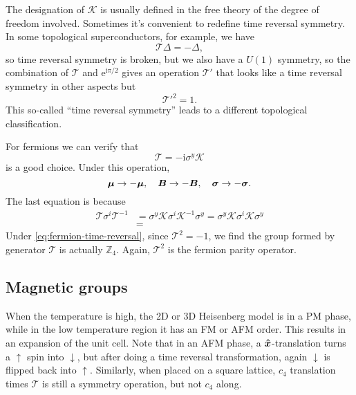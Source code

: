 \documentclass[hyperref, a4paper]{article}
\newcommand*{\ii}{\mathrm{i}}
\newcommand*{\ee}{\mathrm{e}}
\begin{document}
The designation of $\mathcal{K}$ is usually defined in the free theory of the degree of freedom involved.
Sometimes it's convenient to redefine time reversal symmetry. In some topological superconductors, for example, 
we have 
\begin{equation}
    \mathcal{T} \Delta = - \Delta, 
\end{equation}
so time reversal symmetry is broken, but we also have a $U(1)$ symmetry, so the combination of $\mathcal{T}$
and $\ee^{\ii \pi / 2}$ gives an operation $\mathcal{T}'$ that looks like a time reversal symmetry in 
other aspects but 
\begin{equation}
    \mathcal{T}'^2 = 1.
\end{equation}
This so-called ``time reversal symmetry'' leads to a different topological classification.

For fermions we can verify that 
\begin{equation}
    \mathcal{T} = - \ii \sigma^y \mathcal{K}
    \label{eq:fermion-time-reversal}
\end{equation}
is a good choice. Under this operation, 
\[
    \vb*{\mu} \to - \vb*{\mu}, \quad \vb*{B} \to - \vb*{B}, \quad \vb*{\sigma} \to - \vb*{\sigma}.
\]
The last equation is because 
\[
    \begin{aligned}
        \mathcal{T} \sigma^i \mathcal{T}^{-1} &= \sigma^y \mathcal{K} \sigma^i \mathcal{K}^{-1} \sigma^y = \sigma^y \mathcal{K} \sigma^i \mathcal{K} \sigma^y  \\
        &= 
    \end{aligned}
\]
Under \eqref{eq:fermion-time-reversal}, since $\mathcal{T}^2 = -1$, we find the group formed by generator $\mathcal{T}$
is actually $\mathbb{Z}_4$. 
Again, $\mathcal{T}^2$ is the fermion parity operator.

\subsection{Magnetic groups}

When the temperature is high, the 2D or 3D Heisenberg model is in a PM phase, while in the low temperature 
region it has an FM or AFM order. This results in an expansion of the unit cell. Note that in an AFM
phase, a $\vu*{x}$-translation turns a $\uparrow$ spin into $\downarrow$, but after doing a time reversal 
transformation, again $\downarrow$ is flipped back into $\uparrow$. Similarly, when placed on a square lattice, 
$c_4$ translation times $\mathcal{T}$ is still a symmetry operation, but not $c_4$ along.
\end{document}
